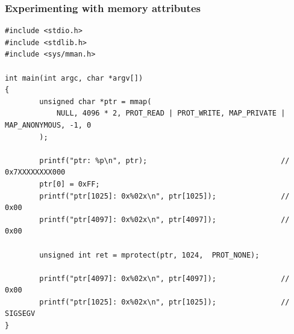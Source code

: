 \begin{frame}[fragile]
  \frametitle{Experimenting with memory attributes}
  \begin{verbatim}
#include <stdio.h>
#include <stdlib.h>
#include <sys/mman.h>

int main(int argc, char *argv[])
{
        unsigned char *ptr = mmap(
            NULL, 4096 * 2, PROT_READ | PROT_WRITE, MAP_PRIVATE | MAP_ANONYMOUS, -1, 0
        );

        printf("ptr: %p\n", ptr);                               // 0x7XXXXXXXX000
        ptr[0] = 0xFF;
        printf("ptr[1025]: 0x%02x\n", ptr[1025]);               // 0x00
        printf("ptr[4097]: 0x%02x\n", ptr[4097]);               // 0x00

        unsigned int ret = mprotect(ptr, 1024,  PROT_NONE);

        printf("ptr[4097]: 0x%02x\n", ptr[4097]);               // 0x00
        printf("ptr[1025]: 0x%02x\n", ptr[1025]);               // SIGSEGV
}
  \end{verbatim}
\end{frame}

